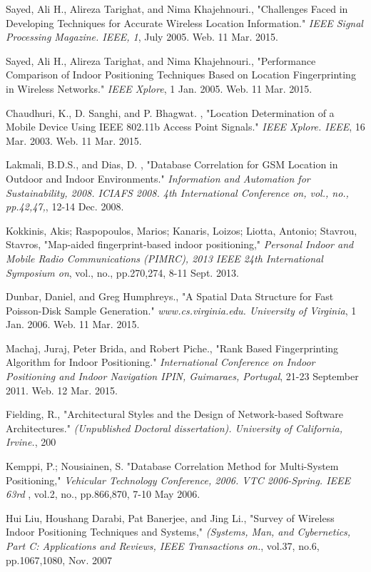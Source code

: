 \documentclass[conference]{IEEEtran}
\begin{document}
\begin{thebibliography}{99}

 Sayed, Ali H., Alireza Tarighat, and Nima Khajehnouri.,
"Challenges Faced in Developing Techniques for Accurate Wireless Location Information."
\emph{IEEE Signal Processing Magazine. IEEE, 1}, July 2005. Web. 11 Mar. 2015.
 
 Sayed, Ali H., Alireza Tarighat, and Nima Khajehnouri.,
"Performance Comparison of Indoor Positioning Techniques Based on Location Fingerprinting in Wireless Networks."
\emph{IEEE Xplore}, 1 Jan. 2005. Web. 11 Mar. 2015. 
 
 Chaudhuri, K., D. Sanghi, and P. Bhagwat. ,
"Location Determination of a Mobile Device Using IEEE 802.11b Access Point Signals."
\emph{IEEE Xplore. IEEE}, 16 Mar. 2003. Web. 11 Mar. 2015.

 Lakmali, B.D.S., and Dias, D. ,
"Database Correlation for GSM Location in Outdoor and Indoor Environments."
\emph{Information and Automation for Sustainability, 2008. ICIAFS 2008. 4th International Conference on, vol., no., pp.42,47,}, 12-14 Dec. 2008.
 
 Kokkinis, Akis; Raspopoulos, Marios; Kanaris, Loizos; Liotta, Antonio; Stavrou, Stavros,
"Map-aided fingerprint-based indoor positioning,"
\emph{Personal Indoor and Mobile Radio Communications (PIMRC), 2013 IEEE 24th International Symposium on}, vol., no., pp.270,274, 8-11 Sept. 2013.

 Dunbar, Daniel, and Greg Humphreys.,
"A Spatial Data Structure for Fast Poisson-Disk Sample Generation."
\emph{www.cs.virginia.edu. University of Virginia},  1 Jan. 2006. Web. 11 Mar. 2015. 

 Machaj, Juraj, Peter Brida, and Robert Piche.,
"Rank Based Fingerprinting Algorithm for Indoor Positioning."
\emph{ International Conference on Indoor Positioning and Indoor Navigation IPIN, Guimaraes, Portugal},  21-23 September 2011. Web. 12 Mar. 2015.

 Fielding, R.,
"Architectural Styles and the Design of Network-based Software Architectures."
\emph{ (Unpublished Doctoral dissertation). University of California, Irvine.}, 200

 Kemppi, P.; Nousiainen, S.
"Database Correlation Method for Multi-System Positioning,"
\emph{Vehicular Technology Conference, 2006. VTC 2006-Spring. IEEE 63rd },  vol.2, no., pp.866,870, 7-10 May 2006.

 Hui Liu, Houshang Darabi, Pat Banerjee, and Jing Li.,
"Survey of Wireless Indoor Positioning Techniques and Systems,"
\emph{ (Systems, Man, and Cybernetics, Part C: Applications and Reviews, IEEE Transactions on.}, vol.37, no.6, pp.1067,1080, Nov. 2007 


\end{thebibliography}
\end{document}
